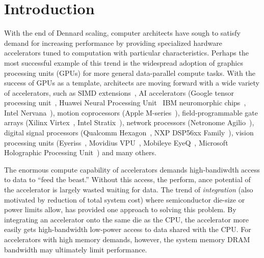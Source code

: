 \chapter{Introduction}
\label{ch:introduction}


With the end of Dennard scaling, computer architects have sough to satisfy demand for increasing performance by providing specialized hardware accelerators tuned to computation with particular characteristics.
Perhaps the most successful example of this trend is the widespread adoption of graphics processing units (GPUs) for more general data-parallel compute tasks.
With the success of GPUs as a template, architects are moving forward with a wide variety of accelerators, such as
SIMD extensions~\cite{intel2017avx, matz2013sse, arm2017neon},
AI accelerators (Google tensor processing unit~\cite{jouppi2017datacenter}, Huawei Neural Processing Unit~\cite{huawei2017kirin} IBM neuromorphic chips~\cite{merolla2014million}, Intel Nervana~\cite{intel2017nervana}),
motion coprocessors (Apple M-series~\cite{kandangath2015coremotion}),
field-programmable gate arrays (Xilinx Virtex~\cite{xilinx2018virtex}, Intel Stratix~\cite{intel2018stratix}), 
network processors (Netronome Agilio~\cite{netronome2018agilio}),
digital signal processors (Qualcomm Hexagon~\cite{codrescu2013hexagon}, NXP DSP56xx Family~\cite{nxp2018dsp}),
vision processing units (Eyeriss~\cite{chen2017eyeriss}, Movidius VPU~\cite{movidius2018vpu}, Mobileye EyeQ~\cite{mobileye2018eyeq}, Microsoft Holographic Processing Unit~\cite{microsoft2018hpu})
and many others.

The enormous compute capability of accelerators demands high-bandiwdth access to data to ``feed the beast.''
Without this access, the perform, ance potential of the accelerator is largely wasted waiting for data.
The trend of \textit{integration} (also motivated by reduction of total system cost) where semiconductor die-size or power limits allow, has provided one approach to solving this problem.
By integrating an accelerator onto the same die as the CPU, the accelerator more easily gets high-bandwidth low-power access to data shared with the CPU.
For accelerators with high memory demands, however, the system memory DRAM bandwidth may ultimately limit performance.

